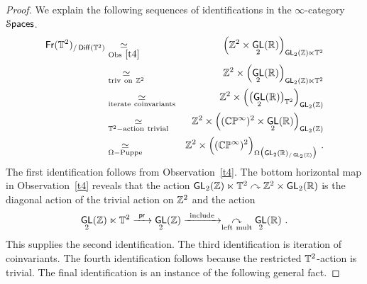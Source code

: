 \documentclass{amsart}
\theoremstyle{definition}
\theoremstyle{remark}
\DeclareMathOperator{\pr}{\mathsf{pr}}
\newcommand{\lacts}{\curvearrowright}
\DeclareMathOperator{\Diff}{{\sf Diff}}
\DeclareMathOperator{\Spaces}{\cS\mathsf{paces}}
\newcommand{\xra}{\xrightarrow}
\DeclareMathOperator{\GL}{\sf GL}
\DeclareMathOperator{\Fr}{\sf Fr}
\begin{document}
\begin{proof}
We explain the following sequences of identifications in the $\infty$-category $\Spaces$.
\begin{eqnarray}
\nonumber
\Fr(\TT^2)_{/\Diff(\TT^2)} 
&
\underset{\rm Obs~\ref{t4}}
{~\simeq~}
&
\Bigl(
\ZZ^2
\times
\GL_2(\RR) 
\Bigr)_{\GL_2(\ZZ) \ltimes \TT^2}
\\
\nonumber
&
\underset{\rm triv~on~\ZZ^2}
{~\simeq~}
&
\ZZ^2
\times
\Bigl(
\GL_2(\RR) 
\Bigr)_{ \GL_2(\ZZ) \ltimes \TT^2 }
\\
\nonumber
&
\underset{\rm iterate~coinvariants}
{~\simeq~}
&
\ZZ^2
\times
\Bigl(
\bigl(
\GL_2(\RR) 
\bigl)_{\TT^2}
\Bigr)_{ \GL_2(\ZZ)}
\\
\nonumber
&
\underset{\rm \TT^2-action~trivial}
{~\simeq~}
&
\ZZ^2
\times
\Bigl(
(\CC\PP^\infty)^2\times \GL_2(\RR) 
\Bigr)_{ \GL_2(\ZZ)}
\\
\nonumber
&
\underset{\rm \Omega-Puppe}
{~\simeq~}
&
\ZZ^2
\times
\Bigl(
(\CC\PP^\infty)^2
\Bigr)_{ \Omega \bigl( \GL_2(\RR)_{/\GL_2(\ZZ)} \bigr) }
~.
\end{eqnarray}
The first identification follows from Observation~\ref{t4}.
The bottom horizontal map in Observation~\ref{t4} reveals that the action $\GL_2(\ZZ) \ltimes \TT^2 \lacts \ZZ^2 \times \GL_2(\RR)$ is the diagonal action of the trivial action on $\mathbb Z^2$ and the action \[
\GL_2(\ZZ) \ltimes \TT^2 \xra{~\pr~} \GL_2(\ZZ) \xra{~\rm include~} \underset{\rm left~mult}\lacts \GL_2(\RR)
~.
\]
This supplies the second identification.  
The third identification is iteration of coinvariants.
The fourth identification follows because the restricted $\mathbb T^2$-action is trivial.  
The final identification is an instance of the following general fact.


\end{proof}
\end{document}
